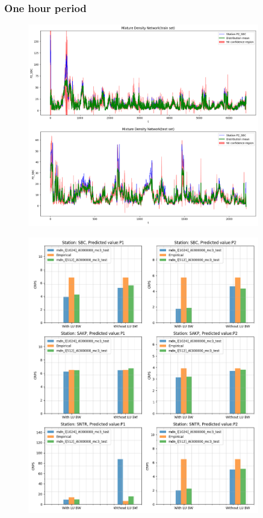 \documentclass[12pt,a4paper,twoside]{scrartcl}
\numberwithin{equation}{section}
\begin{document}
\subsubsection{One hour period}

\begin{center}
  \begin{figure}[htbp]
    \centering
    \includegraphics[height=0.75\textwidth, width=0.9\textwidth]{figures/mdn_1h}
    \caption[MDN one hour plot]{}\label{fig:mdn-1h-plot}
  \end{figure}
\end{center}

\begin{center}
  \begin{figure}[htbp]
    \centering
    \includegraphics[height=0.75\textwidth, width=0.9\textwidth]{figures/results_plot_CRPS_1h}
    \caption[CRPS one hour results]{}\label{fig:crps-1h}
  \end{figure}
\end{center}
\end{document}
